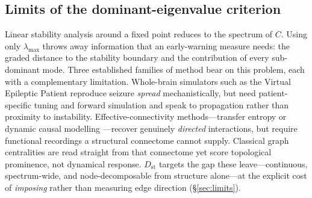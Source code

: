 \documentclass[11pt,a4paper]{article}
\newcommand{\Dst}{D_{\mathrm{st}}}
\begin{document}
\subsection{Limits of the dominant-eigenvalue criterion}
Linear stability analysis around a fixed point reduces to the spectrum of $C$. Using only
$\lambda_{\max}$ throws away information that an early-warning measure needs: the graded distance to
the stability boundary and the contribution of every sub-dominant mode. Three established families of method bear on this problem, each with a complementary limitation.
Whole-brain simulators such as the Virtual Epileptic Patient \citep{jirsa2017,sanzleon2013} reproduce
seizure \emph{spread} mechanistically, but need patient-specific tuning and forward simulation and
speak to propagation rather than proximity to instability. Effective-connectivity methods---transfer
entropy \citep{vicente2011} or dynamic causal modelling \citep{friston2003}---recover genuinely
\emph{directed} interactions, but require functional recordings a structural connectome cannot supply.
Classical graph centralities \citep{rubinov2010,liao_lizier2026} are read straight from that connectome
yet score topological prominence, not dynamical response. $\Dst$ targets the gap these
leave---continuous, spectrum-wide, and node-decomposable from structure alone---at the explicit cost
of \emph{imposing} rather than measuring edge direction (\S\ref{sec:limits}).
\end{document}

